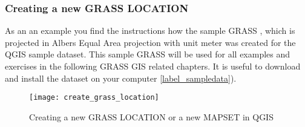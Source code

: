 \subsubsection{Creating a new GRASS LOCATION}\label{sec:create_loc}

As an an example you find the instructions how the sample GRASS
, which is projected in Albers Equal Area
projection with unit meter was created for the QGIS sample dataset. This
sample GRASS  will be used for all examples and
exercises in the following GRASS GIS related chapters. It is useful to
download and install the dataset on your computer \ref{label_sampledata}).

\begin{figure}[ht]
\begin{center}
\caption{Creating a new GRASS LOCATION or a new MAPSET in QGIS \nixcaption}
\label{fig:create_grass_location}\smallskip
\texttt{[image: create\_grass\_location]}
\end{center}  
\end{figure}

